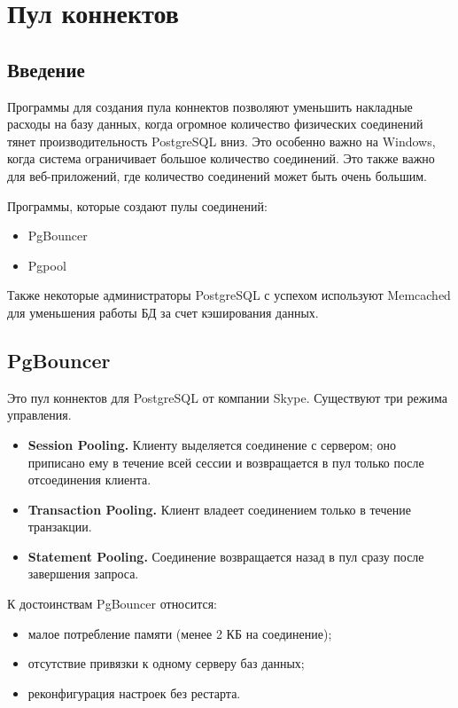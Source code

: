 \chapter{Пул коннектов}
\section{Введение}
Программы для создания пула коннектов позволяют уменьшить накладные расходы на базу данных, 
когда огромное количество физических соединений тянет производительность PostgreSQL вниз. 
Это особенно важно на Windows, когда система ограничивает большое количество соединений. 
Это также важно для веб-приложений, где количество соединений может быть очень большим.

Программы, которые создают пулы соединений:
\begin{itemize}
\item PgBouncer
\item Pgpool
\end{itemize}

Также некоторые администраторы PostgreSQL с успехом используют Memcached для уменьшения работы БД 
за счет кэширования данных.

\section{PgBouncer}
Это пул коннектов для PostgreSQL от компании Skype. Существуют три режима управления.
\begin{itemize}
\item \textbf{Session Pooling.}
Клиенту выделяется соединение с сервером; оно приписано ему в течение всей сессии и 
возвращается в пул только после отсоединения клиента.
\item \textbf{Transaction Pooling.} 
Клиент владеет соединением только в течение транзакции.
\item \textbf{Statement Pooling.} 
Соединение возвращается назад в пул сразу после завершения запроса.
\end{itemize}

К достоинствам PgBouncer относится:
\begin{itemize}
\item малое потребление памяти (менее 2 КБ на соединение);
\item отсутствие привязки к одному серверу баз данных;
\item реконфигурация настроек без рестарта.
\end{itemize}

